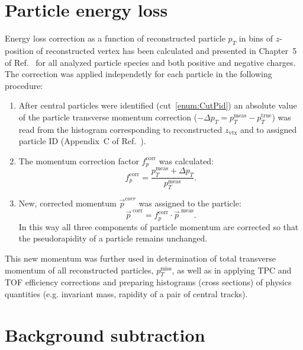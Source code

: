 \section{Particle energy loss}\label{sec:energyLoss}

Energy loss correction as a function of reconstructed particle $p_{T}$ in bins of $z$-position of reconstructed vertex has been calculated and presented in Chapter~5 of Ref.~\cite{supplementaryNote} for all analyzed particle species and both positive and negative charges. The correction was applied independetly for each particle in the following procedure:

\begin{enumerate}
	\item After central particles were identified (cut~\ref{enum:CutPid}) an absolute value of the particle transverse momentum correction ($-\Delta p_{T} = p_{T}^{\text{meas}}-p_{T}^{\text{true}}$) was read from the histogram corresponding to reconstructed $z_{\text{vtx}}$ and to assigned particle ID (Appendix~C of Ref.~\cite{supplementaryNote}).
	\item The momentum correction factor $f_{p}^{\text{corr}}$ was calculated:
	\begin{equation}\label{eq:pCorrFactor}
 f_{p}^{\text{corr}} = \frac{p_{T}^{\text{meas}} + \Delta p_{T}}{p_{T}^{\text{meas}}}.
  \end{equation}
  \item New, corrected momentum $\vec{p}^{corr}$ was assigned to the particle:
  \begin{equation}
   \vec{p}^{~\text{corr}} = f_{p}^{\text{corr}} \cdot \vec{p}^{~\text{meas}}.
  \end{equation}
  In this way all three components of particle momentum are corrected so that the pseudorapidity of a particle remains unchanged.
\end{enumerate}
This new momentum was further used in determination of total transverse momentum of all reconstructed particles, $p_{T}^{\text{miss}}$, as well as in applying TPC and TOF efficiency corrections and preparing histograms (cross sections) of physics quantities (e.g. invariant mass, rapidity of a pair of central tracks).


\section{Background subtraction}\label{sec:bkgdSubtraction}

